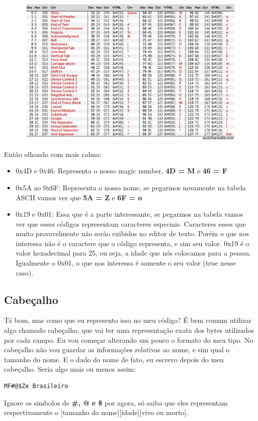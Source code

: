 \documentclass[a4paper,oneside,12pt]{article}
\begin{document}
\begin{figure}[h]
    \centering
    \includegraphics[width=\linewidth]{media/ASCII.jpg}
\end{figure}

Então olhando com mais calma:
\begin{itemize}
    \item 0x4D e 0x46: Representa o nosso magic number, \textbf{4D = M} e \textbf{46 = F}
    \item 0x5A ao 0x6F: Representa o nosso nome, se pegarmos novamente na tabela ASCII vamos ver que \textbf{5A = Z} e \textbf{6F = o}
    \item 0x19 e 0x01: Essa que é a parte interessante, se pegarmos na tabela vamos ver que esses códigos representam caracteres especiais. Caracteres esses que muito provavelmente não serão exibidos no editor de texto. Porém o que nos interessa não é o caractere que o código representa, e sim seu valor. 0x19 é o valor hexadecimal para 25, ou seja, a idade que nós colocamos para a pessoa. Igualmente o 0x01, o que nos interessa é somente o seu valor (true nesse caso).
\end{itemize}

\subsection{Cabeçalho}

Tá bom, mas como que eu represento isso no meu código? É bem comum utilizar algo chamado cabeçalho, que vai ter uma representação exata dos bytes utilizados por cada campo.
Eu vou começar alterando um pouco o formato do meu tipo. No cabeçalho não vou guardar as informações relativas ao nome, e sim qual o tamanho do nome. E o dado do nome de fato, eu escrevo depois do meu cabeçalho. Seria algo mais ou menos assim:
\begin{lstlisting}
MF#@$Ze Brasileiro
\end{lstlisting}
Ignore os simbolos de \textbf{\#, @ e \$} por agora, só saiba que eles representam respectivamente o [tamanho do nome][idade][vivo ou morto].
\end{document}
